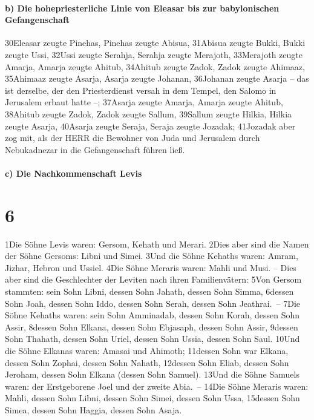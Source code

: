 \hypertarget{b-die-hohepriesterliche-linie-von-eleasar-bis-zur-babylonischen-gefangenschaft}{%
\paragraph{b) Die hohepriesterliche Linie von Eleasar bis zur
babylonischen
Gefangenschaft}\label{b-die-hohepriesterliche-linie-von-eleasar-bis-zur-babylonischen-gefangenschaft}}

30Eleasar zeugte Pinehas, Pinehas zeugte Abisua, 31Abisua zeugte Bukki,
Bukki zeugte Ussi, 32Ussi zeugte Serahja, Serahja zeugte Merajoth,
33Merajoth zeugte Amarja, Amarja zeugte Ahitub, 34Ahitub zeugte Zadok,
Zadok zeugte Ahimaaz, 35Ahimaaz zeugte Asarja, Asarja zeugte Johanan,
36Johanan zeugte Asarja -- das ist derselbe, der den Priesterdienst
versah in dem Tempel, den Salomo in Jerusalem erbaut hatte --; 37Asarja
zeugte Amarja, Amarja zeugte Ahitub, 38Ahitub zeugte Zadok, Zadok zeugte
Sallum, 39Sallum zeugte Hilkia, Hilkia zeugte Asarja, 40Asarja zeugte
Seraja, Seraja zeugte Jozadak; 41Jozadak aber zog mit, als der HERR die
Bewohner von Juda und Jerusalem durch Nebukadnezar in die Gefangenschaft
führen ließ.

\hypertarget{c-die-nachkommenschaft-levis}{%
\paragraph{c) Die Nachkommenschaft
Levis}\label{c-die-nachkommenschaft-levis}}

\hypertarget{section-5}{%
\section{6}\label{section-5}}

1Die Söhne Levis waren: Gersom, Kehath und Merari. 2Dies aber sind die
Namen der Söhne Gersoms: Libni und Simei. 3Und die Söhne Kehaths waren:
Amram, Jizhar, Hebron und Ussiel. 4Die Söhne Meraris waren: Mahli und
Musi. -- Dies aber sind die Geschlechter der Leviten nach ihren
Familienvätern: 5Von Gersom stammten: sein Sohn Libni, dessen Sohn
Jahath, dessen Sohn Simma, 6dessen Sohn Joah, dessen Sohn Iddo, dessen
Sohn Serah, dessen Sohn Jeathrai.~-- 7Die Söhne Kehaths waren: sein Sohn
Amminadab, dessen Sohn Korah, dessen Sohn Assir, 8dessen Sohn Elkana,
dessen Sohn Ebjasaph, dessen Sohn Assir, 9dessen Sohn Thahath, dessen
Sohn Uriel, dessen Sohn Ussia, dessen Sohn Saul. 10Und die Söhne Elkanas
waren: Amasai und Ahimoth; 11dessen Sohn war Elkana, dessen Sohn Zophai,
dessen Sohn Nahath, 12dessen Sohn Eliab, dessen Sohn Jeroham, dessen
Sohn Elkana (dessen Sohn Samuel). 13Und die Söhne Samuels waren: der
Erstgeborene Joel und der zweite Abia.~-- 14Die Söhne Meraris waren:
Mahli, dessen Sohn Libni, dessen Sohn Simei, dessen Sohn Ussa, 15dessen
Sohn Simea, dessen Sohn Haggia, dessen Sohn Asaja.

